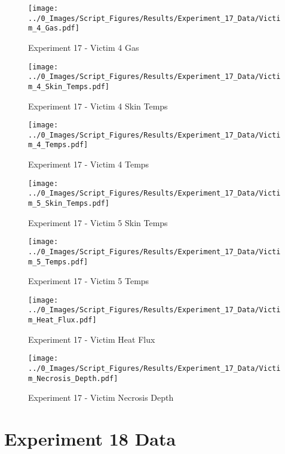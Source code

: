 	\clearpage

	\begin{figure}[H]
		\centering
		\texttt{[image: ../0\_Images/Script\_Figures/Results/Experiment\_17\_Data/Victim\_4\_Gas.pdf]}
		\caption[]{Experiment 17 - Victim 4 Gas}
	\end{figure}
 

	\begin{figure}[H]
		\centering
		\texttt{[image: ../0\_Images/Script\_Figures/Results/Experiment\_17\_Data/Victim\_4\_Skin\_Temps.pdf]}
		\caption[]{Experiment 17 - Victim 4 Skin Temps}
	\end{figure}
 
	\clearpage

	\begin{figure}[H]
		\centering
		\texttt{[image: ../0\_Images/Script\_Figures/Results/Experiment\_17\_Data/Victim\_4\_Temps.pdf]}
		\caption[]{Experiment 17 - Victim 4 Temps}
	\end{figure}
 

	\begin{figure}[H]
		\centering
		\texttt{[image: ../0\_Images/Script\_Figures/Results/Experiment\_17\_Data/Victim\_5\_Skin\_Temps.pdf]}
		\caption[]{Experiment 17 - Victim 5 Skin Temps}
	\end{figure}
 
	\clearpage

	\begin{figure}[H]
		\centering
		\texttt{[image: ../0\_Images/Script\_Figures/Results/Experiment\_17\_Data/Victim\_5\_Temps.pdf]}
		\caption[]{Experiment 17 - Victim 5 Temps}
	\end{figure}
 

	\begin{figure}[H]
		\centering
		\texttt{[image: ../0\_Images/Script\_Figures/Results/Experiment\_17\_Data/Victim\_Heat\_Flux.pdf]}
		\caption[]{Experiment 17 - Victim Heat Flux}
	\end{figure}
 
	\clearpage

	\begin{figure}[H]
		\centering
		\texttt{[image: ../0\_Images/Script\_Figures/Results/Experiment\_17\_Data/Victim\_Necrosis\_Depth.pdf]}
		\caption[]{Experiment 17 - Victim Necrosis Depth}
	\end{figure}
 

\clearpage		\large
\section{Experiment 18 Data} \label{App:Exp18Results} 

